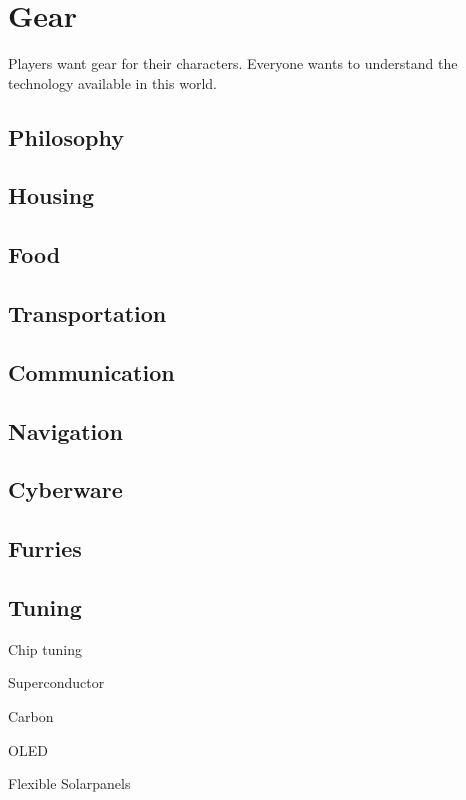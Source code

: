 \chapter{Gear}

Players want gear for their characters. Everyone wants to understand the technology available in this world.

\section{Philosophy}

\section{Housing}

\section{Food}

\section{Transportation}

\section{Communication}

\section{Navigation}

\section{Cyberware}

\section{Furries}

\section{Tuning}

Chip tuning

Superconductor

Carbon

OLED

Flexible Solarpanels